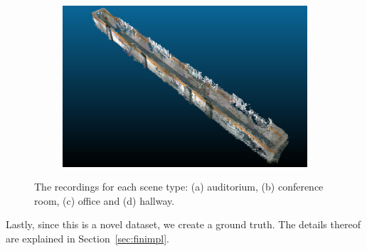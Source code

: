 \documentclass[main.tex]{subfiles}
\begin{document}
\begin{figure}[H]
\begin{subfigure}{0.5\textwidth}
        \caption[Dynamic Dataset office]{}
        \label{fig:fin425}
    \end{subfigure}
    \begin{subfigure}{0.5\textwidth}
        \centering
        \includegraphics[width=0.9\linewidth]{images/hallway.png}
        \caption[Dynamic Dataset office]{}
        \label{fig:finhw}
    \end{subfigure}
    \caption[Dynamic Datasets]{The recordings for each scene type: (a) auditorium, (b) conference room, (c) office and (d) hallway.}
    \label{fig:fin}
\end{figure}
Lastly, since this is a novel dataset, we create a ground truth. The details thereof are explained in Section~\ref{sec:finimpl}.


\end{document}
